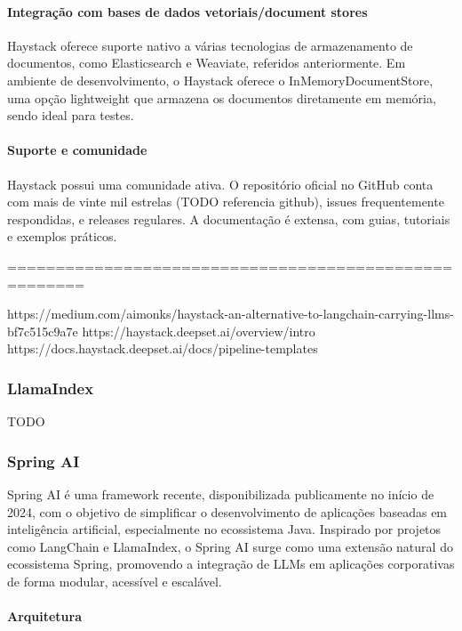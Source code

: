 \paragraph{Integração com bases de dados vetoriais/document stores}

Haystack oferece suporte nativo a várias tecnologias de armazenamento de documentos, como Elasticsearch e Weaviate, referidos anteriormente. Em ambiente de desenvolvimento, o Haystack oferece o InMemoryDocumentStore, uma opção lightweight que armazena os documentos diretamente em memória, sendo ideal para testes.

\paragraph{Suporte e comunidade}

Haystack possui uma comunidade ativa. O repositório oficial no GitHub conta com mais de vinte mil estrelas (TODO referencia github), issues frequentemente respondidas, e releases regulares. A documentação é extensa, com guias, tutoriais e exemplos práticos.


======================================================

https://medium.com/aimonks/haystack-an-alternative-to-langchain-carrying-llms-bf7c515c9a7e
https://haystack.deepset.ai/overview/intro
https://docs.haystack.deepset.ai/docs/pipeline-templates



\subsubsection{LlamaIndex}

TODO



\subsubsection{Spring AI}


Spring AI é uma framework recente, disponibilizada publicamente no início de 2024, com o objetivo de simplificar o desenvolvimento de aplicações baseadas em inteligência artificial, especialmente no ecossistema Java. Inspirado por projetos como LangChain e LlamaIndex, o Spring AI surge como uma extensão natural do ecossistema Spring, promovendo a integração de LLMs em aplicações corporativas de forma modular, acessível e escalável.

\paragraph{Arquitetura}

